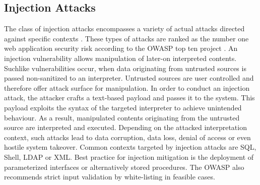 \subsection{Injection Attacks}
The class of injection attacks encompasses a variety of actual attacks directed against specific contexts \cite{OWASP:2013}. These types of attacks are ranked as the number one web application security risk according to the OWASP top ten project \cite{OWASP:2013b}. An injection vulnerability allows manipulation of later-on interpreted contents. Suchlike vulnerabilities occur, when data originating from untrusted sources is passed non-sanitized to an interpreter. Untrusted sources are user controlled and therefore offer attack surface for manipulation. In order to conduct an injection attack, the attacker crafts a text-based payload and passes it to the system. This payload exploits the syntax of the targeted interpreter to achieve unintended behaviour. As a result, manipulated contents originating from the untrusted source are interpreted and executed. Depending on the attacked interpretation context, such attacks lead to data corruption, data loss, denial of access or even hostile system takeover. Common contexts targeted by injection attacks are SQL, Shell, LDAP or XML. Best practice for injection mitigation is the deployment of parameterized interfaces or alternatively stored procedures. The OWASP also recommends strict input validation by white-listing in feasible cases.
